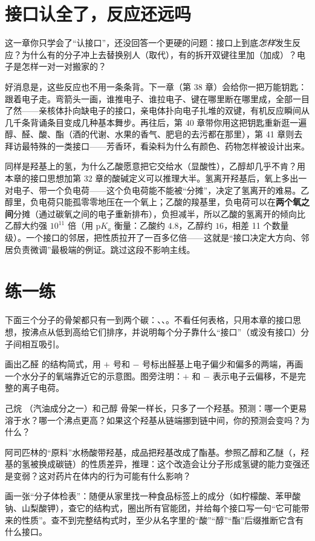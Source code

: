 \section{接口认全了，反应还远吗}

这一章你只学会了“认接口”，还没回答一个更硬的问题：接口上到底\emph{怎样}发生反应？为什么有的分子冲上去替换别人（取代），有的拆开双键往里加（加成）？电子是怎样一对一对搬家的？

好消息是，这些反应也不用一条条背。下一章（第 38 章）会给你一把万能钥匙：跟着电子走。弯箭头一画，谁推电子、谁拉电子、键在哪里断在哪里成，全部一目了然——亲核体扑向缺电子的接口，亲电体扑向电子扎堆的双键，有机反应瞬间从几千条背诵条目变成几种基本舞步。再往后，第 40 章带你用这把钥匙重新逛一遍醇、醛、酸、酯（酒的代谢、水果的香气、肥皂的去污都在那里），第 41 章则去拜访最特殊的一类接口——芳香环，看染料为什么有颜色、药物怎样被设计出来。

\begin{tiaozhan}
同样是羟基上的氢，为什么乙酸愿意把它交给水（显酸性），乙醇却几乎不肯？用本章的接口思想加第 32 章的酸碱定义可以推理大半。氢离开羟基后，氧上多出一对电子、带一个负电荷——这个负电荷能不能被“分摊”，决定了氢离开的难易。乙醇里，负电荷只能孤零零地压在一个氧上；乙酸的羧基里，负电荷可以在\textbf{两个氧之间}分摊（通过碳氧之间的电子重新排布），负担减半，所以乙酸的氢离开的倾向比乙醇大约强 $10^{11}$ 倍（用 p$K_a$ 衡量：乙酸约 $4.8$，乙醇约 $16$，相差 11 个数量级）。一个接口的邻居，把性质拉开了一百多亿倍——这就是“接口决定大方向、邻居负责微调”最极端的例证。跳过这段不影响主线。
\end{tiaozhan}

\section*{练一练}

\begin{sikaoti}
\item 下面三个分子的骨架都只有一到两个碳：、、。不看任何表格，只用本章的接口思想，按沸点从低到高给它们排序，并说明每个分子靠什么“接口”（或没有接口）分子间相互吸引。
\item 画出乙醛  的结构简式，用 $+$ 号和 $-$ 号标出醛基上电子偏少和偏多的两端，再画一个水分子的氧端靠近它的示意图。图旁注明：$+$ 和 $-$ 表示电子云偏移，不是完整的离子电荷。
\item 己烷 （汽油成分之一）和己醇  骨架一样长，只多了一个羟基。预测：哪一个更易溶于水？哪一个沸点更高？如果这个羟基从链端挪到链中间，你的预测会变吗？为什么？
\item 阿司匹林的“原料”水杨酸带羟基，成品把羟基改成了酯基。参照乙醇和乙醚（，羟基的氢被换成碳链）的性质差异，推理：这个改造会让分子形成氢键的能力变强还是变弱？这对药片在体内的行为可能有什么影响？
\item 画一张“分子体检表”：随便从家里找一种食品标签上的成分（如柠檬酸、苯甲酸钠、山梨酸钾），查它的结构式，圈出所有官能团，并给每个接口写一句“它可能带来的性质”。查不到完整结构式时，至少从名字里的“酸”“醇”“酯”后缀推断它含有什么接口。
\end{sikaoti}

